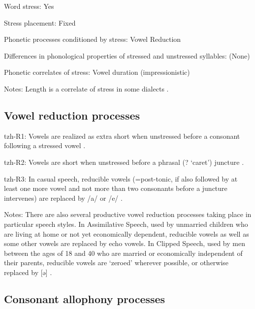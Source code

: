 {\begin{appendixdesc}
\item[Word stress:] Yes

\item[Stress placement:] Fixed

\item[Phonetic processes conditioned by stress:] Vowel Reduction

\item[Differences in phonological properties of stressed and unstressed syllables:] (None)

\item[Phonetic correlates of stress:] Vowel duration (impressionistic)

\item[Notes:] Length is a correlate of stress in some dialects \citep[23]{Polian2006}.
\end{appendixdesc}
\subsection*{Vowel reduction processes}
\begin{appendixdesc}

\item[tzh-R1:] Vowels are realized as extra short when unstressed before a consonant following a stressed vowel \citep[12]{Kaufman1971}.

\item[tzh-R2:] Vowels are short when unstressed before a phrasal (? ‘caret’) juncture \citep[12]{Kaufman1971}.

\item[tzh-R3:] In casual speech, reducible vowels (=post-tonic, if also followed by at least one more vowel and not more than two consonants before a juncture intervenes) are replaced by /a/ or /e/ \citep[26--27]{Kaufman1971}.

\item[Notes:] There are also several productive vowel reduction processes taking place in particular speech styles. In Assimilative Speech, used by unmarried children who are living at home or not yet economically dependent, reducible vowels as well as some other vowels are replaced by echo vowels. In Clipped Speech, used by men between the ages of 18 and 40 who are married or economically independent of their parents, reducible vowels are ‘zeroed’ wherever possible, or otherwise replaced by [ə] \citep[26--27]{Kaufman1971}.
\end{appendixdesc}
\subsection*{Consonant allophony processes}
\begin{appendixdesc}


\end{appendixdesc}}
